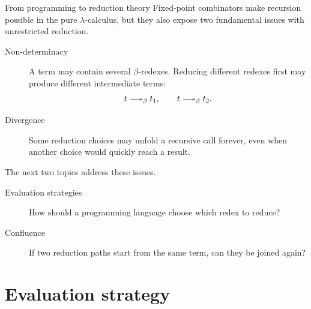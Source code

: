 \begin{frame}{From programming to reduction theory}
  Fixed-point combinators make recursion possible in the pure $\lambda$-calculus,
but they also expose two fundamental issues with unrestricted reduction.

  \begin{description}
    \item[Non-determinacy]
      A term may contain several $\beta$-redexes.  Reducing different redexes
      first may produce different intermediate terms:
      \[
        t \reduce t_1,
        \qquad
        t \reduce t_2.
      \]

    \item[Divergence]
      Some reduction choices may unfold a recursive call forever, even when
      another choice would quickly reach a result.
  \end{description}

  \vfill

  The next two topics address these issues.

  \begin{description}
    \item[Evaluation strategies]
      How should a programming language choose which redex to reduce?

    \item[Confluence]
      If two reduction paths start from the same term, can they be joined again?
  \end{description}
\end{frame}


\section{Evaluation strategy}

